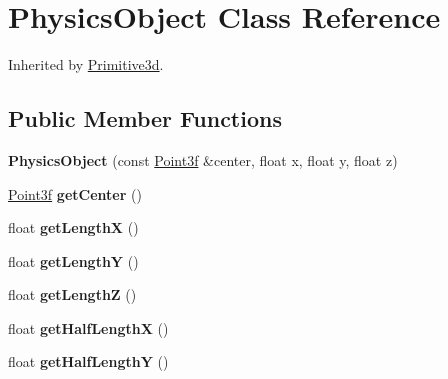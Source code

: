 \hypertarget{class_physics_object}{\section{Physics\-Object Class Reference}
\label{class_physics_object}
}


Inherited by \hyperlink{class_primitive3d}{Primitive3d}.

\subsection*{Public Member Functions}
\begin{DoxyCompactItemize}
\item 
\hypertarget{class_physics_object_a2eb26709a112c2cde307a533359464fe}{{\bfseries Physics\-Object} (const \hyperlink{struct_point3f}{Point3f} \&center, float x, float y, float z)}\label{class_physics_object_a2eb26709a112c2cde307a533359464fe}

\item 
\hypertarget{class_physics_object_a518b9fb4a3db4c93361470882a92bdcf}{\hyperlink{struct_point3f}{Point3f} {\bfseries get\-Center} ()}\label{class_physics_object_a518b9fb4a3db4c93361470882a92bdcf}

\item 
\hypertarget{class_physics_object_a2e8498a00b8b00926799618c55389ba2}{float {\bfseries get\-Length\-X} ()}\label{class_physics_object_a2e8498a00b8b00926799618c55389ba2}

\item 
\hypertarget{class_physics_object_aa957a7b01b46d848eefcbe73d398427c}{float {\bfseries get\-Length\-Y} ()}\label{class_physics_object_aa957a7b01b46d848eefcbe73d398427c}

\item 
\hypertarget{class_physics_object_a15b61bf834cef49b5d9dc0019ced2ed7}{float {\bfseries get\-Length\-Z} ()}\label{class_physics_object_a15b61bf834cef49b5d9dc0019ced2ed7}

\item 
\hypertarget{class_physics_object_ab8bca32287f7b0f09f0b45f15364ffc0}{float {\bfseries get\-Half\-Length\-X} ()}\label{class_physics_object_ab8bca32287f7b0f09f0b45f15364ffc0}

\item 
\hypertarget{class_physics_object_ae25b36e015889532f8916a4ad4f1c361}{float {\bfseries get\-Half\-Length\-Y} ()}\label{class_physics_object_ae25b36e015889532f8916a4ad4f1c361}


\end{DoxyCompactItemize}
